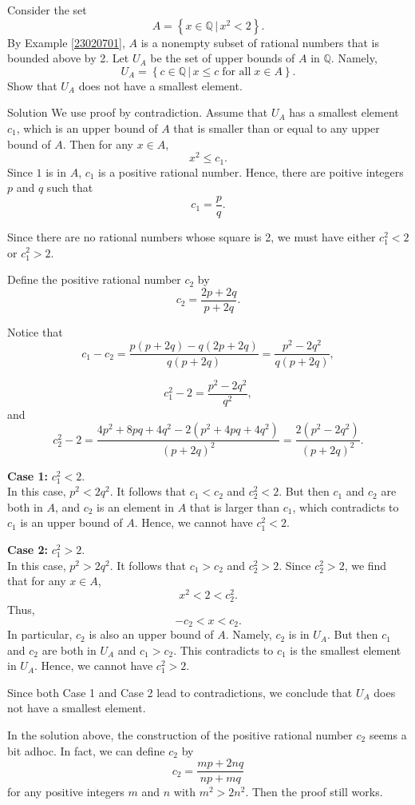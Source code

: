 \begin{example}[label=ex23020101]{}
Consider the set 
\[A=\left\{x\in\mathbb{Q}\,|\, x^2<2\right\}.\]
By Example \ref{23020701},  $A$ is a nonempty subset of rational numbers that is bounded above by 2.
Let $U_A$ be the set of upper bounds of $A$ in $\mathbb{Q}$. Namely,
\[U_A=\left\{c\in\mathbb{Q}\,|\, x\leq c\;\text{for all}\;x\in A\right\}.\]
Show that $U_A$ does not have a smallest element.
\end{example}
\begin{solution}{Solution}
We use proof by contradiction. Assume that $U_A$ has a smallest element $c_1$, which is an upper bound of $A$ that is smaller than or equal to any upper bound of $A$. Then for any $x\in A$, 
\[x^2\leq c_1.\] 
 Since $1$ is in $A$,  $c_1$ is a positive rational number. Hence, there are poitive integers $p$ and $q$ such that
\[c_1=\frac{p}{q}.\]

Since there are no rational numbers whose square is 2, we must have either $c_1^2<2$ or $c_1^2>2$.  
 
Define the positive rational  number $c_2$ by
\[c_2=\frac{2p+2q}{p+2q}.\]


Notice that
\[c_1-c_2=\frac{p(p+2q)-q(2p+2q)}{q(p+2q)}=\frac{p^2-2q^2}{q(p+2q)},\]

\[c_1^2-2=\frac{p^2-2q^2}{q^2},\]
and 
\[c_2^2-2=\frac{4p^2+8pq+4q^2-2(p^2+4pq+4q^2)}{(p+2q)^2}=\frac{2(p^2-2q^2)}{(p+2q)^2}.\]


\textbf{Case 1: } $c_1^2<2$.\\
In this case, $p^2<2q^2$. It follows that $c_1<c_2$ and $c_2^2<2$. But then $c_1$ and $c_2$ are both in $A$, and $c_2$ is an element in $A$ that is larger than $c_1$, which contradicts to $c_1$ is an upper bound of $A$. Hence, we cannot have $c_1^2<2$.
\bs

\textbf{Case 2: } $c_1^2>2$.\\
In this case, $p^2>2q^2$. It follows that $c_1>c_2$ and $c_2^2>2$. 
Since $c_2^2>2$, we find that for any $x\in A$, \[x^2<2<c_2^2.\]Thus, 
\[-c_2<x<c_2.\] In particular, $c_2$ is also an upper bound of $A$. Namely, $c_2$ is in $U_A$.
But then $c_1$ and $c_2$ are both in $U_A$ and $c_1>c_2$. This contradicts to $c_1$ is the smallest element in $U_A$. Hence, we cannot have $c_1^2>2$.


Since both Case 1 and Case 2 lead to contradictions, we conclude that $U_A$ does not have a smallest element.
\end{solution}

In the solution above, the construction of the positive rational number $c_2$ seems a bit adhoc. In fact, we can define $c_2$ by
\[c_2=\frac{m p+2n q}{n p+m q}\]for any positive integers $m$ and $n$ with $m^2>2n^2$. Then the proof still works.

